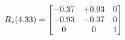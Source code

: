 \documentclass[preview]{standalone}
\begin{document}
\begin{align*}
\special{dvisvgm:raw <g id='unique000'>}R_{z}(4.33) = \begin{bmatrix}-0.37 & +0.93 & 0 \\-0.93 & -0.37 & 0 \\0 & 0 & 1\end{bmatrix}\special{dvisvgm:raw </g>}
\end{align*}
\end{document}
